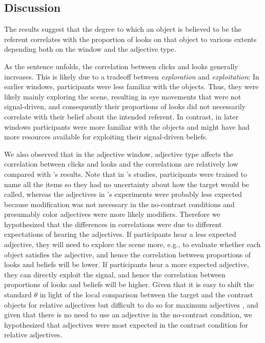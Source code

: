 \documentclass[10pt,letterpaper]{article}
\begin{document}
\subsection{Discussion}

The results suggest that the degree to which an object is believed to be the referent correlates with the 
 proportion of looks on that object to various extents depending both on the window and the adjective type. 
 
As the sentence unfolds, the correlation between clicks and looks generally increases.
This is likely due to a tradeoff between \emph{exploration} and \emph{exploitation}: In earlier windows, participants were less
 familiar with the objects. Thus, they were likely mainly exploring the scene, resulting in eye movements that were not signal-driven, and consequently their proportions of looks did not necessarily correlate with their belief about the intended referent.
In contrast, in later windows participants were more familiar with the objects and might have had more resources available for exploiting their signal-driven beliefs.

We also observed that in the adjective window, adjective type affects 
 the correlation between clicks and looks and the correlations are relatively low compared with \citeauthor{AllopennaEtAl1998:Tracking-the-Time-}'s results.
Note that in \citeauthor{AllopennaEtAl1998:Tracking-the-Time-}'s studies, participants were trained to name all the items so they had no uncertainty 
 about how the target would be called, whereas the adjectives in \citeauthor{LeffelXiangKennedy2016:Imprecision-is-Pragmatic-}'s experiments
 were probably less expected because modification was not necessary in the no-contrast conditions and presumably color adjectives were more likely modifiers.
Therefore we hypothesized that the differences in correlations were due to  different expectations of hearing the adjectives.
If participants hear a less expected adjective, they will need to explore the scene more, e.g., to evaluate
whether each object satisfies the adjective, and hence the correlation between proportions of looks and 
beliefs will be lower.
If participants hear a more expected adjective, they can directly exploit the signal, and hence 
 the correlation between proportions of looks and beliefs will be higher.
Given that it is easy to shift the standard $\theta$ in light of the local comparison between the target and the contrast objects for relative adjectives but difficult to do so for maximum adjectives  
 \cite{SyrettKennedyLidz2010:Meaning-and-Context-}, and given that there is no need to use an adjective in the no-contrast condition, we
hypothesized that adjectives were most expected in the contrast condition for relative adjectives.
\end{document}
